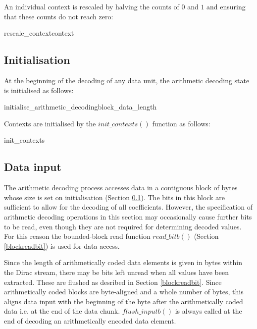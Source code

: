An individual context is rescaled by halving the counts of $0$ and $1$ and ensuring that
these counts do not reach zero:

\begin{pseudo}{rescale\_context}{context}
\bsEND
\end{pseudo}

\subsection{Initialisation}
\label{initarith}

At the beginning of the decoding of any data unit, the arithmetic
decoding state is initialised as follows:

\begin{pseudo}{initialise\_arithmetic\_decoding}{block\_data\_length}
\end{pseudo}

Contexts are initialised by the $init\_contexts()$ function as follows:

\begin{pseudo}{init\_contexts}{}
\bsEND
\end{pseudo}

\subsection{Data input}
\label{inputarith}

The arithmetic decoding process accesses data in a contiguous block of bytes
whose size is set on initialisation (Section \ref{initarith}). The bits in this
block are sufficient to allow for the
decoding of all coefficients. However, the specification of arithmetic
decoding operations in this section may occasionally cause further bits to be read,
even though they are not required for determining decoded values. For this
reason the bounded-block read function $read\_bitb()$ (Section \ref{blockreadbit}) is 
used for data access.

Since the length of arithmetically coded data elements is given in bytes within the Dirac
stream, there may be bits left unread when all values have been extracted. These
are flushed as desribed in Section \ref{blockreadbit}. Since arithmetically coded blocks
are byte-aligned and a whole number of bytes, this aligns data input with the beginning of the byte 
after the arithmetically coded data i.e. at the end of the
data chunk. $flush\_inputb()$ is always called at the end of decoding an arithmetically encoded
data element.

